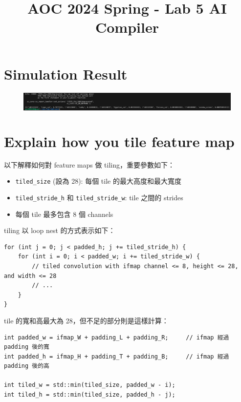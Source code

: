 \documentclass{article}
\title{\Large AOC 2024 Spring - Lab 5 AI Compiler}
\begin{document}
\maketitle

\section{Simulation Result}

\begin{figure}[h]
    \centering
    \includegraphics[width=\linewidth]{images/result.png}
\end{figure}

\section{Explain how you tile feature map}

以下解釋如何對 feature maps 做 tiling，重要參數如下：

\begin{itemize}
    \item \verb|tiled_size| (設為 28): 每個 tile 的最大高度和最大寬度
    \item \verb|tiled_stride_h| 和 \verb|tiled_stride_w|: tile 之間的 strides
    \item 每個 tile 最多包含 8 個 channels
\end{itemize}

tiling 以 loop nest 的方式表示如下：

\begin{verbatim}
for (int j = 0; j < padded_h; j += tiled_stride_h) {
    for (int i = 0; i < padded_w; i += tiled_stride_w) {
        // tiled convolution with ifmap channel <= 8, height <= 28, and width <= 28
        // ...
    }
}
\end{verbatim}

tile 的寬和高最大為 28，但不足的部分則是這樣計算：

\begin{verbatim}
int padded_w = ifmap_W + padding_L + padding_R;     // ifmap 經過 padding 後的寬
int padded_h = ifmap_H + padding_T + padding_B;     // ifmap 經過 padding 後的高

int tiled_w = std::min(tiled_size, padded_w - i);
int tiled_h = std::min(tiled_size, padded_h - j);
\end{verbatim}
\end{document}
